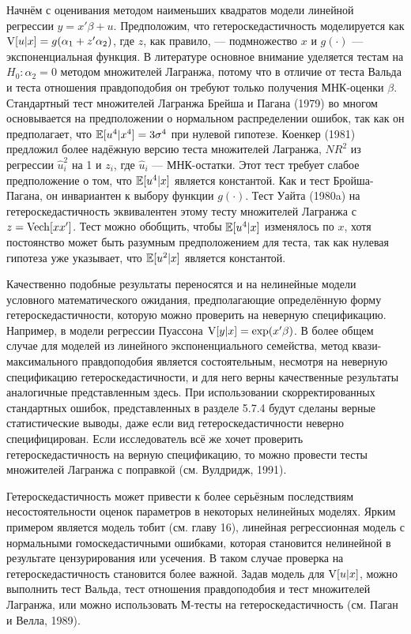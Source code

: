 Начнём с оценивания методом наименьших квадратов модели линейной регрессии $y = x'\beta + u$. Предположим, что гетероскедастичность моделируется как $\mathrm{V}[u|x] = g(\alpha_1 + z'\alpha_2)$, где $z$, как правило, --- подмножество $x$ и $g(\cdot)$ --- экспоненциальная функция. В литературе основное внимание уделяется тестам на $H_0: \alpha_2 = 0$ методом множителей Лагранжа, потому что в отличие от теста Вальда и теста отношения правдоподобия он требуют только получения МНК-оценки $\beta$. Стандартный тест множителей Лагранжа Брейша и Пагана (1979) во многом основывается на предположении о нормальном распределении ошибок, так как он предполагает, что $\mathbb{E}[u^4|x^4] = 3\sigma^4$ при нулевой гипотезе. Коенкер (1981) предложил более надёжную версию теста множителей Лагранжа, $NR^2$ из регрессии $\hat{u}_i^2$ на 1 и $z_i$, где $\hat{u}_i$ --- МНК-остатки. Этот тест требует слабое предположение о том, что $\mathbb{E}[u^4|x]$ является константой. Как и тест Бройша-Пагана, он инвариантен к выбору функции $g(\cdot)$. Тест Уайта (1980a) на гетероскедастичность эквивалентен этому тесту множителей Лагранжа с $z = \mathrm{Vech}[xx']$. Тест можно обобщить, чтобы $\mathbb{E}[u^4|x]$ изменялось по $x$, хотя постоянство может быть разумным предположением для теста, так как нулевая гипотеза уже указывает, что $\mathbb{E}[u^2|x]$ является константой.

Качественно подобные результаты переносятся и на нелинейные модели условного математического ожидания, предполагающие определённую форму гетероскедастичности, которую можно проверить на неверную спецификацию. Например, в модели регрессии Пуассона $\mathrm{V}[y|x] = \exp(x'\beta)$. В более общем случае для моделей из линейного экспоненциального семейства, метод квази-максимального правдоподобия является состоятельным, несмотря на неверную спецификацию гетероскедастичности, и для него верны качественные результаты  аналогичные представленным здесь. При использовании скорректированных стандартных ошибок, представленных в разделе 5.7.4 будут сделаны верные статистические выводы, даже если вид гетероскедастичности неверно специфицирован. Если исследователь всё же хочет проверить гетероскедастичность на верную спецификацию, то можно провести тесты множителей Лагранжа с поправкой (см. Вулдридж, 1991).

Гетероскедастичность может привести к более серьёзным последствиям несостоятельности оценок параметров в некоторых нелинейных моделях. Ярким примером является модель тобит (см. главу 16), линейная регрессионная модель с нормальными гомоскедастичными ошибками, которая становится нелинейной в результате цензурирования или усечения. В таком случае проверка на гетероскедастичность становится более важной. Задав модель для $\mathrm{V}[u|x]$, можно выполнить тест Вальда, тест отношения правдоподобия и тест множителей Лагранжа, или можно использовать М-тесты на гетероскедастичность (см. Паган и Велла, 1989).

